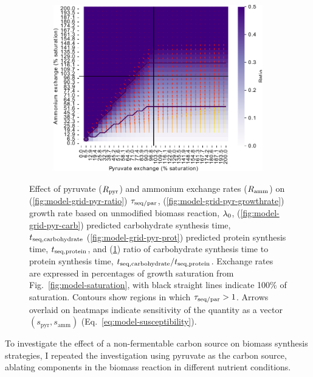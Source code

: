 \begin{figure}
  \begin{subfigure}[t]{0.45\textwidth}
  \centering
    \includegraphics[width=\linewidth]{ec_grid_pyr_amm_carb_to_prot}
    \caption{
    }
    \label{fig:model-grid-pyr-carb-to-prot}
  \end{subfigure}
  \caption{
    Effect of pyruvate ($R_{\mathrm{pyr}}$) and ammonium exchange rates ($R_{\mathrm{amm}}$) on (\ref{fig:model-grid-pyr-ratio}) $\tau_{\mathrm{seq}/\mathrm{par}}$, (\ref{fig:model-grid-pyr-growthrate}) growth rate based on unmodified biomass reaction, $\lambda_{0}$, (\ref{fig:model-grid-pyr-carb}) predicted carbohydrate synthesis time, $t_{\mathrm{seq},\mathrm{carbohydrate}}$ (\ref{fig:model-grid-pyr-prot}) predicted protein synthesis time, $t_{\mathrm{seq},\mathrm{protein}}$, and (\ref{fig:model-grid-pyr-carb-to-prot}) ratio of carbohydrate synthesis time to protein synthesis time, $t_{\mathrm{seq},\mathrm{carbohydrate}}/t_{\mathrm{seq},\mathrm{protein}}$.
    Exchange rates are expressed in percentages of growth saturation from Fig.\ \ref{fig:model-saturation}, with black straight lines indicate 100\% of saturation.
    Contours show regions in which $\tau_{\mathrm{seq}/\mathrm{par}} > 1$.
    Arrows overlaid on heatmaps indicate sensitivity of the quantity as a vector $(s_{\mathrm{pyr}}, s_{\mathrm{amm}})$ (Eq.\ \ref{eq:model-susceptibility}).
  }
  \label{fig:model-grid-pyr}
\end{figure}

To investigate the effect of a non-fermentable carbon source on biomass synthesis strategies, I repeated the investigation using pyruvate as the carbon source, ablating components in the biomass reaction in different nutrient conditions.%

